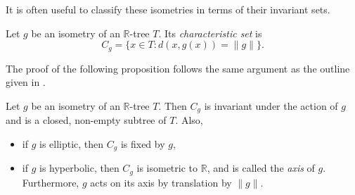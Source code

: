 It is often useful to classify these isometries in terms of their invariant sets.
\begin{definition}
    Let $g$ be an isometry of an $\mathbb{R}$-tree $T$. Its \emph{characteristic set} is \[C_g = \{x\in T:d(x,g(x))=\lVert g \rVert\}.\]
\end{definition}
The proof of the following proposition follows the same argument as the outline given in \cite{CullerMorgan}.
\begin{proposition}
    Let $g$ be an isometry of an $\mathbb{R}$-tree $T$. Then $C_g$ is invariant under the action of $g$ and is a closed, non-empty subtree of $T$. Also,
    \begin{itemize}
        \item if $g$ is elliptic, then $C_g$ is fixed by $g$,
        \item if $g$ is hyperbolic, then $C_g$ is isometric to $\mathbb{R}$, and is called the \emph{axis} of $g$. Furthermore, $g$ acts on its axis by translation by $\lVert g\rVert$.
    \end{itemize}
\end{proposition}

